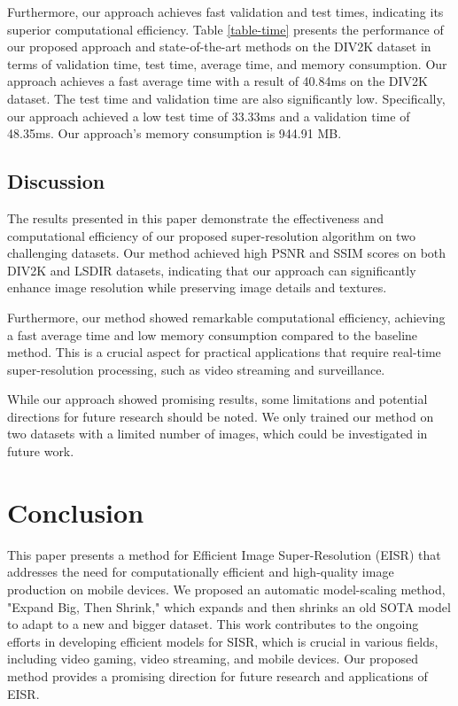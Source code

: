 \documentclass[10pt,twocolumn,letterpaper]{article}
\begin{document}
Furthermore, our approach achieves fast validation and test times, indicating its superior computational efficiency. Table \ref{table-time} presents the performance of our proposed approach and state-of-the-art methods on the DIV2K dataset in terms of validation time, test time, average time, and memory consumption. Our approach achieves a fast average time with a result of 40.84ms on the DIV2K dataset. The test time and validation time are also significantly low. Specifically, our approach achieved a low test time of 33.33ms and a validation time of 48.35ms. Our approach's memory consumption is 944.91 MB.


\subsection{Discussion}
The results presented in this paper demonstrate the effectiveness and computational efficiency of our proposed super-resolution algorithm on two challenging datasets. Our method achieved high PSNR and SSIM scores on both DIV2K and LSDIR datasets, indicating that our approach can significantly enhance image resolution while preserving image details and textures.

Furthermore, our method showed remarkable computational efficiency, achieving a fast average time and low memory consumption compared to the baseline method. This is a crucial aspect for practical applications that require real-time super-resolution processing, such as video streaming and surveillance.

While our approach showed promising results, some limitations and potential directions for future research should be noted. We only trained our method on two datasets with a limited number of images, which could be investigated in future work.


\section{Conclusion}
\label{sec:conclud}

This paper presents a method for Efficient Image Super-Resolution (EISR) that addresses the need for computationally efficient and high-quality image production on mobile devices. We proposed an automatic model-scaling method, "Expand Big, Then Shrink," which expands and then shrinks an old SOTA model to adapt to a new and bigger dataset. This work contributes to the ongoing efforts in developing efficient models for SISR, which is crucial in various fields, including video gaming, video streaming, and mobile devices. Our proposed method provides a promising direction for future research and applications of EISR.


{\small


}
\end{document}
